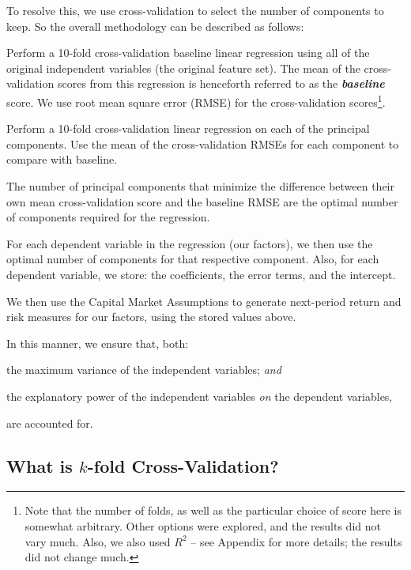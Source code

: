 \documentclass{ledger}
\begin{document}
To resolve this, we use cross-validation to select the number of components to keep. So the overall methodology can be described as follows:
\begin{compactenum}
	\item Perform a 10-fold cross-validation baseline linear regression using all of the original independent variables (the original feature set). The mean of the cross-validation scores  from this regression is henceforth referred to as the  \textbf{\textit{baseline}} score. We use root mean square error (RMSE) for the cross-validation scores\footnote{Note that the number of folds, as well as the particular choice of score here is somewhat arbitrary. Other options were explored, and the results did not vary much. Also, we also used $R^2$ -- see Appendix for more details; the results did not change much.}.
	\item Perform a 10-fold cross-validation linear regression on each of the principal components. Use the mean of the cross-validation RMSEs for each component to compare with baseline.
	\begin{compactenum}[$\bullet$]	
		\item The number of principal components that minimize the difference between their own mean cross-validation score and the baseline RMSE are the optimal number of components required for the regression. 
	\end{compactenum}
	\item For each dependent variable in the regression (our factors), we then use the optimal number of components for that respective component. Also, for each dependent variable, we store: the coefficients, the error terms, and the intercept.
	\item We then use the Capital Market Assumptions to generate next-period return and risk measures for our factors, using the stored values above. \\
\end{compactenum}

In this manner, we ensure that, both:
\begin{compactenum}[$\bullet$]	
	\item the maximum variance of the independent variables; \textit{and}
	\item the explanatory power of the independent variables \textit{on} the dependent variables, 
\end{compactenum}
are accounted for. \\

\subsection{What is $k$-fold Cross-Validation?}
\end{document}
